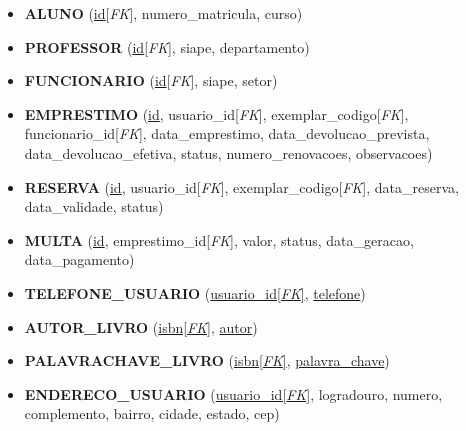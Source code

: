 \documentclass[12pt,a4paper]{article}
\begin{document}
\begin{tcolorbox}[title=Especializações]
\begin{itemize}
    \item \textbf{ALUNO} (\underline{id}[\textit{FK}], numero\_matricula, curso)

    \item \textbf{PROFESSOR} (\underline{id}[\textit{FK}], siape, departamento)

    \item \textbf{FUNCIONARIO} (\underline{id}[\textit{FK}], siape, setor)
\end{itemize}
\end{tcolorbox}

\begin{tcolorbox}[title=Relacionamentos]
\begin{itemize}
    \item \textbf{EMPRESTIMO} (\underline{id}, usuario\_id[\textit{FK}], exemplar\_codigo[\textit{FK}], funcionario\_id[\textit{FK}], data\_emprestimo, data\_devolucao\_prevista, data\_devolucao\_efetiva, status, numero\_renovacoes, observacoes)

    \item \textbf{RESERVA} (\underline{id}, usuario\_id[\textit{FK}], exemplar\_codigo[\textit{FK}], data\_reserva, data\_validade, status)

    \item \textbf{MULTA} (\underline{id}, emprestimo\_id[\textit{FK}], valor, status, data\_geracao, data\_pagamento)
\end{itemize}
\end{tcolorbox}

\begin{tcolorbox}[title=Atributos Multivalorados]
\begin{itemize}
    \item \textbf{TELEFONE\_USUARIO} (\underline{usuario\_id[\textit{FK}]}, \underline{telefone})

    \item \textbf{AUTOR\_LIVRO} (\underline{isbn[\textit{FK}]}, \underline{autor})

    \item \textbf{PALAVRACHAVE\_LIVRO} (\underline{isbn[\textit{FK}]}, \underline{palavra\_chave})
\end{itemize}
\end{tcolorbox}

\begin{tcolorbox}[title=Atributos Compostos]
\begin{itemize}
    \item \textbf{ENDERECO\_USUARIO} (\underline{usuario\_id[\textit{FK}]}, logradouro, numero, complemento, bairro, cidade, estado, cep)
\end{itemize}
\end{tcolorbox}
\end{document}
